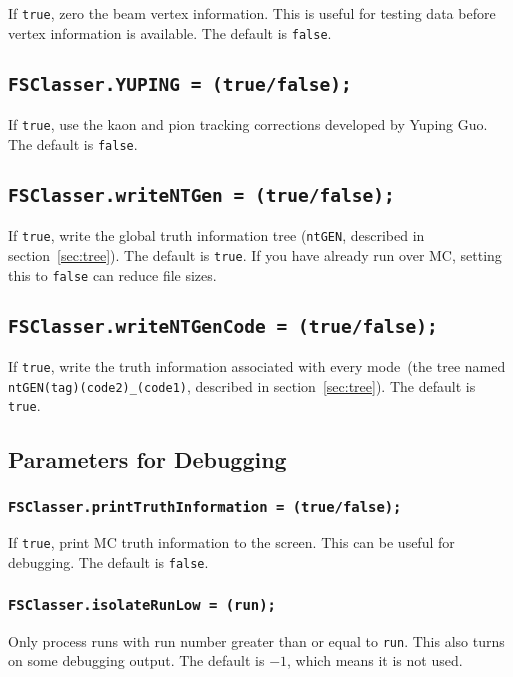 \documentclass[11pt,a4paper]{define/cepcnote}
\begin{document}
If {\tt true}, zero the beam vertex information.  This is useful for testing data before vertex information is available.  The default is {\tt false}.


\subsection{\tt FSClasser.YUPING = (true/false);}

If {\tt true}, use the kaon and pion tracking corrections developed by Yuping Guo.  The default is {\tt false}.

\subsection{\tt FSClasser.writeNTGen = (true/false);}

If {\tt true}, write the global truth information tree ({\tt ntGEN}, described in section~\ref{sec:tree}).  The default is {\tt true}.  If you have already run over MC, setting this to {\tt false} can reduce file sizes.

\subsection{\tt FSClasser.writeNTGenCode = (true/false);}

If {\tt true}, write the truth information associated with every mode~(the tree named {\tt ntGEN(tag)(code2)\_(code1)}, described in section~\ref{sec:tree}).  The default is {\tt true}.  

\subsection{Parameters for Debugging}

\subsubsection{\tt FSClasser.printTruthInformation = (true/false);}

If {\tt true}, print MC truth information to the screen.  This can be useful for debugging.  The default is {\tt false}.

\subsubsection{\tt FSClasser.isolateRunLow = (run);}

Only process runs with run number greater than or equal to {\tt run}.  This also turns on some debugging output.  The default is $-1$, which means it is not used.
\end{document}

